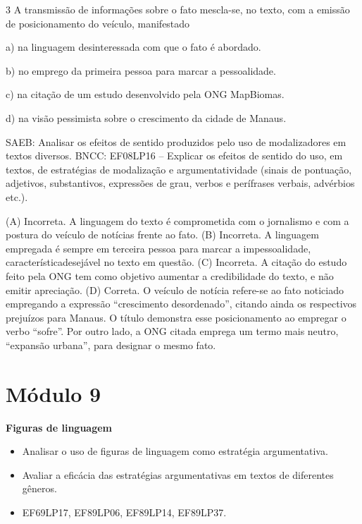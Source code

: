 \num{3} A transmissão de informações sobre o fato mescla-se, no texto,
com a emissão de posicionamento do veículo, manifestado

a) na linguagem desinteressada com que o fato é abordado.

b) no emprego da primeira pessoa para marcar a pessoalidade.

c) na citação de um estudo desenvolvido pela ONG MapBiomas.

d) na visão pessimista sobre o crescimento da cidade de Manaus.

SAEB: Analisar os efeitos de sentido produzidos pelo uso de
modalizadores em textos diversos. BNCC: EF08LP16 -- Explicar os efeitos
de sentido do uso, em textos, de estratégias de modalização e
argumentatividade (sinais de pontuação, adjetivos, substantivos,
expressões de grau, verbos e perífrases verbais, advérbios etc.).

(A) Incorreta. A linguagem do texto é comprometida com o jornalismo e
com a postura do veículo de notícias frente ao fato. (B) Incorreta. A
linguagem empregada é sempre em terceira pessoa para marcar a
impessoalidade, característicadesejável no texto em questão. (C)
Incorreta. A citação do estudo feito pela ONG tem como objetivo aumentar
a credibilidade do texto, e não emitir apreciação. (D) Correta. O
veículo de notícia refere-se ao fato noticiado empregando a expressão
``crescimento desordenado'', citando ainda os respectivos prejuízos para
Manaus. O título demonstra esse posicionamento ao empregar o verbo
``sofre''. Por outro lado, a ONG citada emprega um termo mais neutro,
``expansão urbana'', para designar o mesmo fato.


\section{Módulo 9}

\textbf{Figuras de linguagem}


\begin{itemize}
\tightlist
\item
  Analisar o uso de figuras de linguagem como estratégia argumentativa.
\item
  Avaliar a eficácia das estratégias argumentativas em textos de
  diferentes gêneros.
\end{itemize}


\begin{itemize}
\tightlist
\item
  EF69LP17, EF89LP06, EF89LP14, EF89LP37.
\end{itemize}

